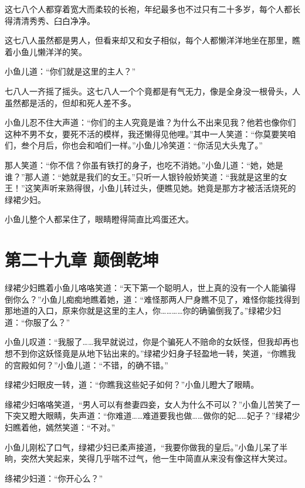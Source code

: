 \documentclass[12pt,oneside]{book}
\begin{document}
这七八个人都穿着宽大而柔较的长袍，年纪最多也不过只有二十多岁，每个人都长得清清秀秀、臼白净净。

这七八人虽然都是男人，但看来却又和女子相似，每个人都懒洋洋地坐在那里，瞧着小鱼儿懒洋洋的笑。

小鱼儿道：``你们就是这里的主人？''

七八人一齐摇了摇头。这七八人一个个竟都是有气无力，像是全身没一根骨头，人虽然都是活的，但却和死人差不多。

小鱼儿忍不住大声道：``你们的主人究竟是谁？为什么不出来见我？他若也像你们这种不男不女，要死不活的模样，我还懒得见他哩。''其中一人笑道：``你莫要笑咱们，叁个月后，你也会和咱们一样。''小鱼儿冷笑道：``你活见大头鬼了。''

那人笑道：``你不信？你虽有铁打的身子，也吃不消她。''小鱼儿道：``她，她是谁？''那人道：``她就是我们的女王。''只听一人银铃般娇笑道：``我就是这里的女王！''这笑声听来熟得很，小鱼儿转过头，便瞧见她。她竟是那方才被活活烧死的绿裙少妇。

小鱼儿整个人都呆住了，眼睛瞪得简直比鸡蛋还大。

\hypertarget{ux7b2cux4e8cux5341ux4e5dux7ae0-ux98a0ux5012ux4e7eux5764}{%
\chapter{第二十九章
颠倒乾坤}\label{ux7b2cux4e8cux5341ux4e5dux7ae0-ux98a0ux5012ux4e7eux5764}}

绿裙少妇瞧着小鱼儿咯咯笑道：``天下第一个聪明人，世上真的没有一个人能骗得倒你么？''小鱼儿痴痴地瞧着她，道：``难怪那两人尸身瞧不见了，难怪你能找得到那地道的入口，原来你就是这里的主人，你\ldots\ldots\ldots\ldots 你的确骗倒我了。''绿裙少妇道：``你服了么？''

小鱼儿叹道：``我服了\ldots\ldots 我早就说过，你是个骗死人不赔命的女妖怪，但我却再也想不到你这妖怪竟是从地下钻出来的。''绿裙少妇身子轻盈地一转，笑道，``你瞧我的宫殿如何？''小鱼儿道：``不错，的确不错。''

绿裙少妇眼皮一转，道：``你瞧我这些妃子如何？''小鱼儿瞪大了眼睛。

缘裙少妇咯咯笑道，``男人可以有叁妻四妾，女人为什么不可以？''小鱼儿苦笑了一下突又瞪大眼睛，失声道：``你难道\ldots\ldots 难道要我也做\ldots\ldots 做你的妃\ldots\ldots 妃子？''绿裙少妇瞧着他，嫣然笑道：``不对。''

小鱼儿刚松了口气，绿裙少妇已柔声接道，``我要你做我的皇后。''小鱼儿呆了半晌，突然大笑起来，笑得几乎喘不过气，他一生中简直从来没有像这样大笑过。

绦裙少妇道：``你开心么？''
\end{document}
